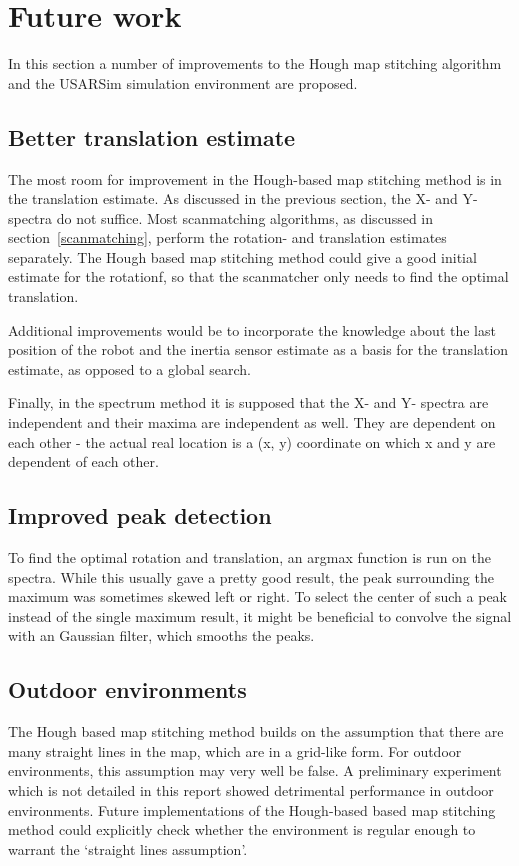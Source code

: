 \section{Future work}
\label{futurework}
In this section a number of improvements to the Hough map stitching algorithm and the USARSim simulation environment are proposed. 

\subsection{Better translation estimate}
The most room for improvement in the Hough-based map stitching method is in the translation estimate. As discussed in the previous section, the X- and Y-spectra do not suffice. Most scanmatching algorithms, as discussed in section~\ref{scanmatching}, perform the rotation- and translation estimates separately. The Hough based map stitching method could give a good initial estimate for the rotationf, so that the scanmatcher only needs to find the optimal translation. 

Additional improvements would be to incorporate the knowledge about the last position of the robot and the inertia sensor estimate as a basis for the translation estimate, as opposed to a global search. 

Finally, in the spectrum method it is supposed that the X- and Y- spectra are independent and their maxima are independent as well. They are dependent on each other - the actual real location is a (x, y) coordinate on which x and y are dependent of each other.

\subsection{Improved peak detection}
To find the optimal rotation and translation, an argmax function is run on the spectra. While this usually gave a pretty good result, the peak surrounding the maximum was sometimes skewed left or right. To select the center of such a peak instead of the single maximum result, it might be beneficial to convolve the signal with an Gaussian filter, which smooths the peaks.

\subsection{Outdoor environments}
The Hough based map stitching method builds on the assumption that there are many straight lines in the map, which are in a grid-like form. For outdoor environments, this assumption may very well be false. A preliminary experiment which is not detailed in this report showed detrimental performance in outdoor environments. Future implementations of the Hough-based based map stitching method could explicitly check whether the environment is regular enough to warrant the `straight lines assumption'.

